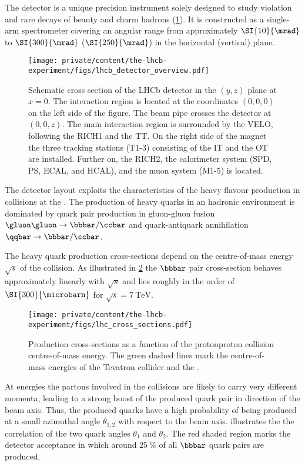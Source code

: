 The \LHCb detector \cite{Alves:2008zz} is a unique precision instrument solely
designed to study \CP violation and rare decays of beauty and charm hadrons
(\cref{fig:lhcb_experiment:detector:overview}). It is constructed as a
single-arm spectrometer covering an angular range from approximately
$\SI{10}{\mrad}$ to $\SI{300}{\mrad}$ ($\SI{250}{\mrad}$) in the horizontal
(vertical) plane.
%
\begin{figure}[t]
  \centering
    \texttt{[image: private/content/the-lhcb-experiment/figs/lhcb\_detector\_overview.pdf]}
  \caption{
    Schematic cross section of the \acs{LHCb} detector in the $(y,z)$ plane at
  $x=0$. The \protonproton interaction region is located at the coordinates
  $(0,0,0)$ on the left side of the figure. The beam pipe crosses the detector at
  $(0,0,z)$. The main interaction region is surrounded by the \acs*{VELO},
  following the \acs*{RICH}1 and the \acs*{TT}. On the right side of the magnet
  the three tracking stations (T1-3) consisting of the \acs*{IT} and the
  \acs*{OT} are installed. Further on, the \acs*{RICH}2, the calorimeter system
  (\acs*{SPD}, \acs*{PS}, \acs*{ECAL}, and \acs*{HCAL}), and the muon system
  (M1-5) is located. \cite{Alves:2008zz}}
  \label{fig:lhcb_experiment:detector:overview}
\end{figure}
%
The detector layout exploits the characteristics of the heavy flavour production
in \protonproton collisions at the \LHC. The production of heavy quarks in an
hadronic environment is dominated by quark pair production in gluon-gluon fusion
$\gluon\gluon\to\bbbar/\ccbar$ and quark-antiquark annihilation
$\qqbar\to\bbbar/\ccbar$.

The heavy quark production cross-sections depend on the centre-of-mass energy
$\sqrt{s}$ of the \protonproton collision. As illustrated in
\cref{fig:lhcb_experiment:detector:cross_section} the $\bbbar$ pair
cross-section behaves approximately linearly with $\sqrt{s}$ and lies roughly in
the order of $\SI{300}{\microbarn}$ for $\sqrt{s}=\SI{7}{\TeV}$.
%
\begin{figure}[t]
  \centering
    \texttt{[image: private/content/the-lhcb-experiment/figs/lhc\_cross\_sections.pdf]}
  \caption{
    Production cross-sections as a function of the \acl{protonproton} collision
  centre-of-mass energy. The green dashed lines mark the centre-of-mass energies
  of the Tevatron collider and the \LHC. \cite{Campbell:2006wx} }
  \label{fig:lhcb_experiment:detector:cross_section}
\end{figure}
%
At \LHC energies the partons involved in the collisions are likely to carry very
different momenta, leading to a strong boost of the produced quark pair in
direction of the beam axis. Thus, the produced quarks have a high probability of
being produced at a small azimuthal angle $\theta_{1,2}$ with respect to the
beam axis.  illustrates the the
correlation of the two quark angles $\theta_{1}$ and $\theta_{2}$. The red
shaded region marks the \LHCb detector acceptance in which around
$\SI{25}{\percent}$ of all $\bbbar$ quark pairs are produced.

